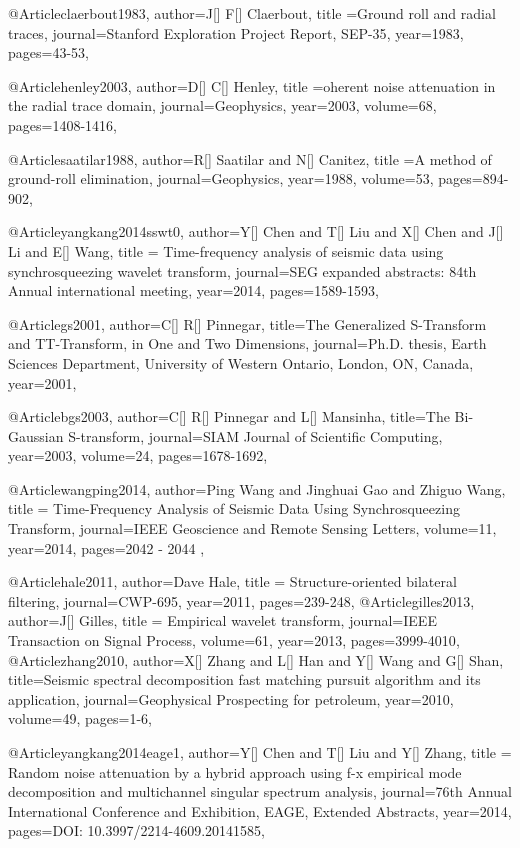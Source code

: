 {@Article{claerbout1983,
  author={J[] F[] Claerbout},
  title ={Ground roll and radial traces},
  journal={Stanford Exploration Project Report, SEP-35},
  year=1983,
  pages={43-53},
}

@Article{henley2003,
  author={D[] C[] Henley},
  title ={oherent noise attenuation in the radial trace domain},
  journal={Geophysics},
  year=2003,
  volume=68,
  pages={1408-1416},
}

@Article{saatilar1988,
  author={R[] Saatilar and N[] Canitez},
  title ={A method of ground-roll elimination},
  journal={Geophysics},
  year=1988,
  volume=53,
  pages={894-902},
}

@Article{yangkang2014sswt0,
  author={Y[] Chen and T[] Liu and X[] Chen and J[] Li and E[] Wang},
  title = {Time-frequency analysis of seismic data using synchrosqueezing wavelet transform},
  journal={SEG expanded abstracts: 84th Annual international meeting},
  year=2014,
  pages={1589-1593},
}


@Article{gs2001,
  author={C[] R[] Pinnegar},
  title={The Generalized S-Transform and TT-Transform, in One and Two Dimensions},
  journal={Ph.D. thesis, Earth Sciences Department, University of Western Ontario, London,
ON, Canada},
  year=2001,
}

@Article{bgs2003,
  author={C[] R[] Pinnegar and L[] Mansinha},
  title={The {B}i-{G}aussian {S}-transform},
  journal={SIAM Journal of Scientific Computing},
  year=2003,
  volume=24,
  pages={1678-1692},
}

@Article{wangping2014,
  author={Ping Wang and Jinghuai Gao and Zhiguo Wang},
  title = {Time-Frequency Analysis of Seismic Data Using Synchrosqueezing Transform},
  journal={IEEE Geoscience and Remote Sensing Letters},
  volume={11},
  year=2014,
  pages={2042 - 2044 },
}




@Article{hale2011,
  author={Dave Hale},
  title = {Structure-oriented bilateral filtering},
  journal={CWP-695},
  year=2011,
  pages={239-248},
}
@Article{gilles2013,
  author={J[] Gilles},
  title = {Empirical wavelet transform},
  journal={IEEE Transaction on Signal Process},
  volume={61},
  year=2013,
  pages={3999-4010},
}
@Article{zhang2010,
  author={X[] Zhang and L[] Han and Y[] Wang and G[] Shan},
  title={Seismic spectral decomposition fast matching pursuit algorithm and its application},
  journal={Geophysical Prospecting for petroleum},
  year=2010,
  volume=49,
  pages={1-6},
}


@Article{yangkang2014eage1,
  author={Y[] Chen and T[] Liu and Y[] Zhang},
  title = {Random noise attenuation by a hybrid approach using f-x empirical mode decomposition and multichannel singular spectrum analysis},
  journal={76th Annual International Conference and Exhibition, EAGE, Extended Abstracts},
  year=2014,
  pages={DOI: 10.3997/2214-4609.20141585},
}

}
